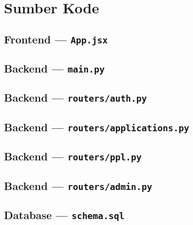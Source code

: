\section{Sumber Kode}
\label{sec:sumber_kode}

\subsection{Frontend --- \texttt{App.jsx}}


\clearpage

\subsection{Backend --- \texttt{main.py}}


\clearpage

\subsection{Backend --- \texttt{routers/auth.py}}


\clearpage

\subsection{Backend --- \texttt{routers/applications.py}}


\clearpage

\subsection{Backend --- \texttt{routers/ppl.py}}


\clearpage

\subsection{Backend --- \texttt{routers/admin.py}}


\clearpage

\subsection{Database --- \texttt{schema.sql}}

